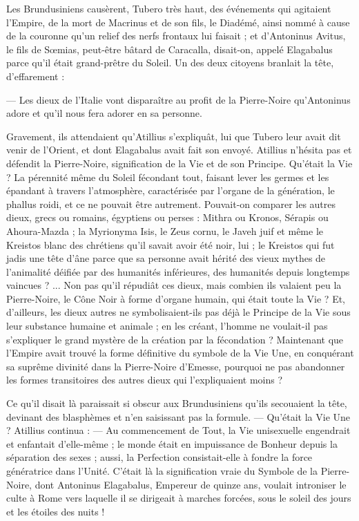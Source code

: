\documentclass[a4paper, 11pt, oneside, polutonikogreek, french]{article}
\begin{document}
Les Brundusiniens causèrent, Tubero très haut, des événements qui agitaient l'Empire, de la mort de Macrinus et de son fils, le Diadémé, ainsi nommé à cause de la couronne qu'un relief des nerfs frontaux lui faisait ; et d'Antoninus Avitus, le fils de Sœmias, peut-être bâtard de Caracalla, disait-on, appelé Elagabalus parce qu'il était grand-prêtre du Soleil. Un des deux citoyens branlait la tête, d'effarement :

--- Les dieux de l'Italie vont disparaître au profit de la Pierre-Noire qu'Antoninus adore et qu'il nous fera adorer en sa personne.

Gravement, ils attendaient qu'Atillius s'expliquât, lui que Tubero leur avait dit venir de l'Orient, et dont Elagabalus avait fait son envoyé. Atillius n'hésita pas et défendit la Pierre-Noire, signification de la Vie et de son Principe. Qu'était la Vie ? La pérennité même du Soleil fécondant tout, faisant lever les germes et les épandant à travers l'atmosphère, caractérisée par l'organe de la génération, le phallus roidi, et ce ne pouvait être autrement. Pouvait-on comparer les autres dieux, grecs ou romains, égyptiens ou perses : Mithra ou Kronos, Sérapis ou Ahoura-Mazda ; la Myrionyma Isis, le Zeus cornu, le Javeh juif et même le Kreistos blanc des chrétiens qu'il savait avoir été noir, lui ; le Kreistos qui fut jadis une tête d'âne parce que sa personne avait hérité des vieux mythes de l'animalité déifiée par des humanités inférieures, des humanités depuis longtemps vaincues ? ... Non pas qu'il répudiât ces dieux, mais combien ils valaient peu la Pierre-Noire, le Cône Noir à forme d'organe humain, qui était toute la Vie ? Et, d'ailleurs, les dieux autres ne symbolisaient-ils pas déjà le Principe de la Vie sous leur substance humaine et animale ; en les créant, l'homme ne voulait-il pas s'expliquer le grand mystère de la création par la fécondation ? Maintenant que l'Empire avait trouvé la forme définitive du symbole de la Vie Une, en conquérant sa suprême divinité dans la Pierre-Noire d'Emesse, pourquoi ne pas abandonner les formes transitoires des autres dieux qui l'expliquaient moins ?

Ce qu'il disait là paraissait si obscur aux Brundusiniens qu'ils secouaient la tête, devinant des blasphèmes et n'en saisissant pas la formule. --- Qu'était la Vie Une ? Atillius continua : --- Au commencement de Tout, la Vie unisexuelle engendrait et enfantait d'elle-même ; le monde était en impuissance de Bonheur depuis la séparation des sexes ; aussi, la Perfection consistait-elle à fondre la force génératrice dans l'Unité. C'était là la signification vraie du Symbole de la Pierre-Noire, dont Antoninus Elagabalus, Empereur de quinze ans, voulait introniser le culte à Rome vers laquelle il se dirigeait à marches forcées, sous le soleil des jours et les étoiles des nuits !
\end{document}
